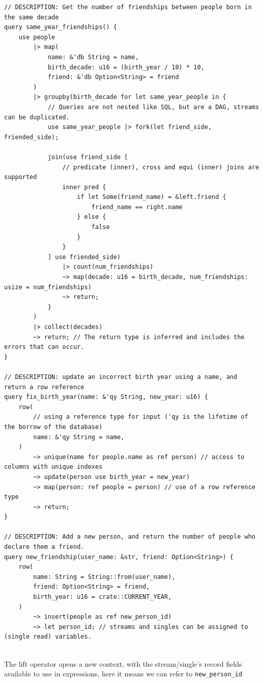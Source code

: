 \begin{verbatim}
// DESCRIPTION: Get the number of friendships between people born in the same decade
query same_year_friendships() {
    use people 
        |> map(
            name: &'db String = name, 
            birth_decade: u16 = (birth_year / 10) * 10,
            friend: &'db Option<String> = friend
        )
        |> groupby(birth_decade for let same_year_people in {
            // Queries are not nested like SQL, but are a DAG, streams can be duplicated.
            use same_year_people |> fork(let friend_side, friended_side);

            join(use friend_side [
                // predicate (inner), cross and equi (inner) joins are supported
                inner pred { 
                    if let Some(friend_name) = &left.friend {
                        friend_name == right.name
                    } else {
                        false
                    }
                }
            ] use friended_side)
                |> count(num_friendships)
                ~> map(decade: u16 = birth_decade, num_friendships: usize = num_friendships)
                ~> return;
            }
        )
        |> collect(decades)
        ~> return; // The return type is inferred and includes the errors that can occur.
}

// DESCRIPTION: update an incorrect birth year using a name, and return a row reference
query fix_birth_year(name: &'qy String, new_year: u16) {
    row(
        // using a reference type for input ('qy is the lifetime of the borrow of the database)
        name: &'qy String = name,
    )
        ~> unique(name for people.name as ref person) // access to columns with unique indexes
        ~> update(person use birth_year = new_year)
        ~> map(person: ref people = person) // use of a row reference type
        ~> return;
}

// DESCRIPTION: Add a new person, and return the number of people who declare them a friend. 
query new_friendship(user_name: &str, friend: Option<String>) {
    row(
        name: String = String::from(user_name),
        friend: Option<String> = friend,
        birth_year: u16 = crate::CURRENT_YEAR,
    )
        ~> insert(people as ref new_person_id)
        ~> let person_id; // streams and singles can be assigned to (single read) variables.
    
\end{verbatim}
The lift operator opens a new context, with the stream/single's record fields
available to use in expressions, here it means we can refer to \texttt{new_person_id}
